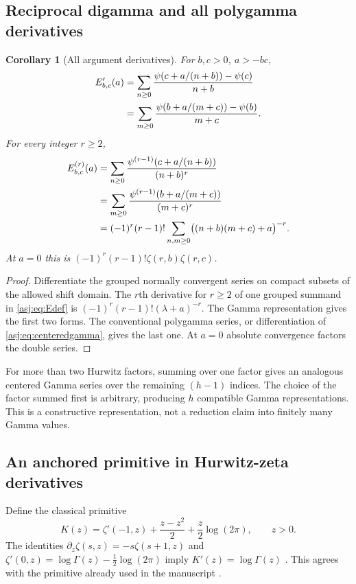 \documentclass[11pt]{article}
\numberwithin{equation}{section}
\newtheorem{corollary}[theorem]{Corollary}
\theoremstyle{definition}\newtheorem{definition}[theorem]{Definition}
\theoremstyle{remark}\newtheorem{remark}[theorem]{Remark}\newtheorem{example}[theorem]{Example}
\begin{document}
\subsection{Reciprocal digamma and all polygamma derivatives}
\begin{corollary}[All argument derivatives]\label{asj:thm:polygamma}
For $b,c>0$, $a>-bc$,
\begin{align}\label{asj:eq:digamma-reciprocity}
 E_{b,c}'(a)
 &=\sum_{n\ge0}\frac{\psi(c+a/(n+b))-\psi(c)}{n+b}\notag\\
 &=\sum_{m\ge0}\frac{\psi(b+a/(m+c))-\psi(b)}{m+c}.
\end{align}
For every integer $r\ge2$,
\begin{align}\label{asj:eq:polygamma-reciprocity}
 E_{b,c}^{(r)}(a)
 &=\sum_{n\ge0}\frac{\psi^{(r-1)}(c+a/(n+b))}{(n+b)^r}\notag\\
 &=\sum_{m\ge0}\frac{\psi^{(r-1)}(b+a/(m+c))}{(m+c)^r}\notag\\
 &=(-1)^r(r-1)!\sum_{n,m\ge0}
                       \bigl((n+b)(m+c)+a\bigr)^{-r}.
\end{align}
At $a=0$ this is $(-1)^r(r-1)!\zeta(r,b)\zeta(r,c)$.
\end{corollary}
\begin{proof}
Differentiate the grouped normally convergent series on compact subsets
of the allowed shift domain. The $r$th derivative for $r\ge2$ of one
grouped summand in \eqref{asj:eq:Edef} is
$(-1)^r(r-1)!(\lambda+a)^{-r}$. The Gamma representation gives the
first two forms. The conventional polygamma series, or differentiation
of \eqref{asj:eq:centeredgamma}, gives the last one. At $a=0$ absolute
convergence factors the double series.
\end{proof}

For more than two Hurwitz factors, summing over one factor gives an
analogous centered Gamma series over the remaining $(h-1)$ indices.
The choice of the factor summed first is arbitrary, producing $h$
compatible Gamma representations. This is a constructive representation,
not a reduction claim into finitely many Gamma values.

\subsection{An anchored primitive in Hurwitz-zeta derivatives}
Define the classical primitive
\begin{equation}\label{asj:eq:Kdef}
 K(z)=\zeta'(-1,z)+\frac{z-z^2}{2}+\frac z2\log(2\pi),\qquad z>0.
\end{equation}
The identities $\partial_z\zeta(s,z)=-s\zeta(s+1,z)$ and
$\zeta'(0,z)=\log\Gamma(z)-\tfrac12\log(2\pi)$ imply
$K'(z)=\log\Gamma(z)$ \cite{dlmf-hurwitz}. This agrees with the
primitive already used in the manuscript \cite{repo}.
\end{document}
